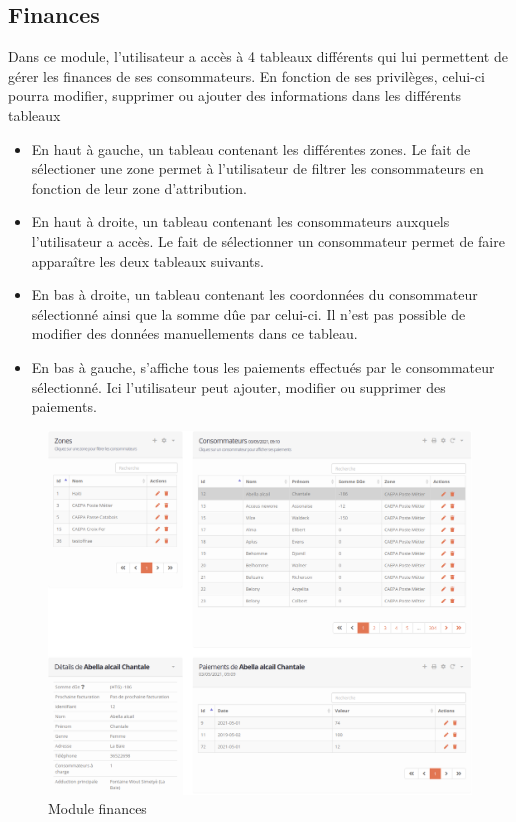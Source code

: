 \documentclass{EPL-master-thesis-covers-FR}
\begin{document}
			\subsection{Finances}
				Dans ce module, l'utilisateur a accès à 4 tableaux différents qui lui permettent de gérer les finances de ses consommateurs. En fonction de ses privilèges, celui-ci pourra modifier, supprimer ou ajouter des informations dans les différents tableaux
				\begin{itemize}
					\item En haut à gauche, un tableau contenant les différentes zones. Le fait de sélectioner une zone permet à l'utilisateur de filtrer les consommateurs en fonction de leur zone d'attribution.
					\item En haut à droite, un tableau contenant les consommateurs auxquels l'utilisateur a accès. Le fait de sélectionner un consommateur permet de faire apparaître les deux tableaux suivants.
					\item En bas à droite, un tableau contenant les coordonnées du consommateur sélectionné ainsi que la somme dûe par celui-ci. Il n'est pas possible de modifier des données manuellements dans ce tableau.
					\item En bas à gauche, s'affiche tous les paiements effectués par le consommateur sélectionné. Ici l'utilisateur peut ajouter, modifier ou supprimer des paiements.
				\end{itemize}
				
				\begin{figure}[H]
					\centering
					\includegraphics[width=1\textwidth]{images/finances}
					\caption{Module finances}
				\end{figure}
				
\end{document}
